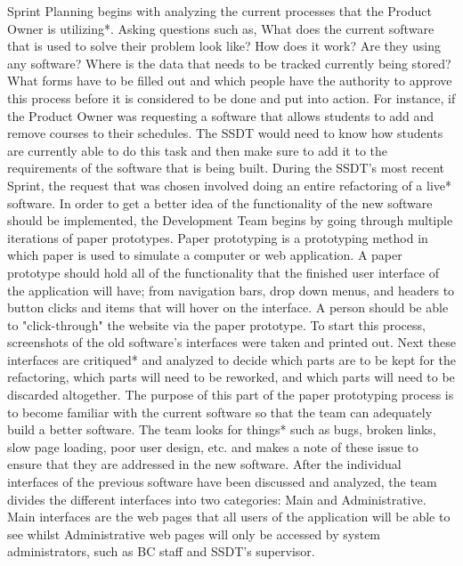 Sprint Planning begins with analyzing the current processes that the Product Owner is utilizing*. Asking questions such as, What does the current software that is used to solve their problem look like? How does it work? Are they using any software? Where is the data that needs to be tracked currently being stored? What forms have to be filled out and which people have the authority to approve this process before it is considered to be done and put into action. For instance, if the Product Owner was requesting a software that allows students to add and remove courses to their schedules. The SSDT would need to know how students are currently able to do this task and then make sure to add it to the requirements of the software that is being built. During the SSDT's most recent Sprint, the request that was chosen involved doing an entire refactoring of a live* software. In order to get a better idea of the functionality of the new software should be implemented, the Development Team begins by going through multiple iterations of paper prototypes. Paper prototyping is a prototyping method in which paper is used to simulate a computer or web application. A paper prototype should hold all of the functionality that the finished user interface of the application will have; from navigation bars, drop down menus, and headers to button clicks and items that will hover on the interface. A person should be able to "click-through" the website via the paper prototype. To start this process, screenshots of the old software's interfaces were taken and printed out. Next these interfaces are critiqued* and analyzed to decide which parts are to be kept for the refactoring, which parts will need to be reworked, and which parts will need to be discarded altogether. The purpose of this part of the paper prototyping process is to become familiar with the current software so that the team can adequately build a better software. The team looks for things* such as bugs, broken links, slow page loading, poor user design, etc. and makes a note of these issue to ensure that they are addressed in the new software. After the individual interfaces of the previous software have been discussed and analyzed, the team divides the different interfaces into two categories: Main and Administrative. Main interfaces are the web pages that all users of the application will be able to see whilst Administrative web pages will only be accessed by system administrators, such as BC staff and SSDT's supervisor. 


